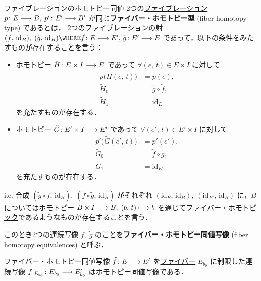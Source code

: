 \documentclass[algtopo_main]{subfiles}
\begin{document}
\begin{mydef}[label=def:fib-hom-equiv, breakable]{ファイブレーションのホモトピー同値}
    2つの\hyperref[def:fibration]{ファイブレーション} $p\colon E \longrightarrow B,\; p' \colon E' \longrightarrow B'$ が同じ\textbf{ファイバー・ホモトピー型} (fiber homotopy type) であるとは，
    2つのファイブレーションの射 $(\tilde{f},\, \mathrm{id}_B),\; (\tilde{g},\, \mathrm{id}_B)\WHERE \tilde{f} \colon E \lto E',\, \tilde{g} \colon E' \lto E$ であって，以下の条件をみたすものが存在することを言う：
    \begin{itemize}
        \item ホモトピー $\tilde{H} \colon E \times I \longrightarrow E$ であって $\forall (e,\, t) \in E \times I$ に対して
        \begin{align}
            p \bigl( \tilde{H}(e,\, t) \bigr) &= p(e), \\
            \tilde{H}_0 &= \tilde{g} \circ \tilde{f}, \\
            \tilde{H}_1 &= \mathrm{id}_{E}
        \end{align}
        を充たすものが存在する．
        \item ホモトピー $\tilde{G} \colon E' \times I \longrightarrow E'$ であって $\forall (e',\, t) \in E' \times I$ に対して
        \begin{align}
            p' \bigl( \tilde{G}(e',\, t) \bigr) &= p'(e'), \\
            \tilde{G}_0 &= \tilde{f} \circ \tilde{g}, \\
            \tilde{G}_1 &= \mathrm{id}_{E'}
        \end{align}
        を充たすものが存在する．
    \end{itemize}
    i.e. 合成 $(\tilde{g} \circ \tilde{f},\, \mathrm{id}_B),\; (\tilde{f} \circ \tilde{g},\, \mathrm{id}_B)$ がそれぞれ $(\mathrm{id}_{E},\, \mathrm{id}_B),\; (\mathrm{id}_{E'},\, \mathrm{id}_B)$ に，$B$ についてはホモトピー $B \times I \longrightarrow B,\; (b,\, t) \longmapsto b$ を通じて\hyperref[def:fib-homotopy]{ファイバー・ホモトピック}であるようなものが存在することを言う．
    
    このとき2つの連続写像 $\tilde{f},\; \tilde{g}$ のことを\textbf{ファイバー・ホモトピー同値写像} (fiber homotopy equivalences) と呼ぶ．
\end{mydef}

\begin{marker}
    ファイバー・ホモトピー同値写像 $\tilde{f} \colon E \longrightarrow E'$ を\hyperref[thm:fiber-basic]{ファイバー} $E_{b_0}$ に制限した連続写像 $\tilde{f}|_{E_{b_0}} \colon E_{b_0} \longrightarrow E'_{b_0}$ はホモトピー同値写像である．
\end{marker}
\end{document}
